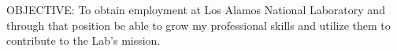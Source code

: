 
OBJECTIVE: To obtain employment at Los Alamos National Laboratory and through that position be able to grow my professional skills and utilize them to contribute to the Lab’s mission.

